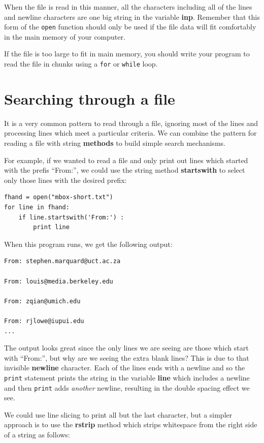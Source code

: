 \documentclass[10pt]{book}
\begin{document}
When the file is read in this manner, all the characters including 
all of the lines and newline characters are one big string 
in the variable {\bf inp}.  
Remember that this form of the {\tt open} function should only be used
if the file data will fit comfortably in the main memory 
of your computer.

If the file is too large to fit in main memory, you should write
your program to read the file in chunks using a {\tt for} or {\tt while}
loop.

\section{Searching through a file}

It is a very common pattern to read through a file, ignoring most
of the lines and processing lines which meet a particular criteria.
We can combine the pattern for reading a file with string {\bf methods}
to build simple search mechanisms.

For example, if we wanted to read a file and only print out lines
which started with the prefis ``From:'', we could use the 
string method {\bf startswith} to select only those lines with
the desired prefix:

\beforeverb
\begin{verbatim}
fhand = open("mbox-short.txt")
for line in fhand:
    if line.startswith('From:') :
        print line
\end{verbatim}
\afterverb
%
When this program runs, we get the following output:

\beforeverb
\begin{verbatim}
From: stephen.marquard@uct.ac.za

From: louis@media.berkeley.edu

From: zqian@umich.edu

From: rjlowe@iupui.edu
...
\end{verbatim}
\afterverb
%
The output looks great since the only lines we are seeing are those 
which start with ``From:'', but why are we seeing the extra blank
lines?  This is due to that invisible {\bf newline} character.
Each of the lines ends with a newline and so the {\tt print} 
statement prints the string in the variable {\bf line} which includes
a newline and then {\tt print} adds {\em another} newline, resulting
in the double spacing effect we see.

We could use line slicing to print all but the last character, but 
a simpler approach is to use the {\bf rstrip} method which strips
whitespace from the right side of a string as follows:
\end{document}
